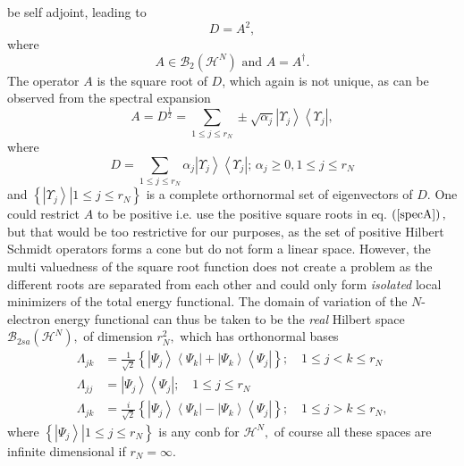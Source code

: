 \documentclass[aps,preprint]{revtex4}%
\begin{document}
be self adjoint, leading to
\begin{equation}
D=A^{2},
\end{equation}
where
\begin{equation}
A\in\mathcal{B}_{2}\left(  \mathcal{H}^{N}\right)  \text{ and }A=A^{\dagger}.
\end{equation}
The operator $A$ is the square root of $D$, which again is not unique, as can
be observed from the spectral expansion
\begin{equation}
A=D^{\frac{1}{2}}=\sum_{1\leq j\leq r_{N}}\pm\sqrt{\alpha_{j}}\left\vert
\Upsilon_{j}\right\rangle \left\langle \Upsilon_{j}\right\vert ,\label{specA}%
\end{equation}
where
\begin{equation}
D=\sum_{1\leq j\leq r_{N}}\alpha_{j}\left\vert \Upsilon_{j}\right\rangle
\left\langle \Upsilon_{j}\right\vert ;\,\alpha_{j}\geq0,1\leq j\leq r_{N}%
\end{equation}
and $\left\{  \left.  \left\vert \Upsilon_{j}\right\rangle \right\vert 1\leq
j\leq r_{N}\right\}  $ is a complete orthornormal set of eigenvectors of $D$.
One could restrict $A$ to be positive i.e. use the positive square roots in
eq. $\left(  \ref{specA}\right)  ,$ but that would be too restrictive for our
purposes, as the set of positive Hilbert Schmidt operators forms a cone
\cite{cone} but do not form a linear space. However, the multi valuedness of
the square root function does not create a problem as the different roots are
separated from each other and could only form \emph{isolated} local minimizers
of the total energy functional. The domain of variation of the $N$-electron
energy functional can thus be taken to be the \emph{real} Hilbert space
$\mathcal{B}_{2sa}\left(  \mathcal{H}^{N}\right)  ,$ of dimension $r_{N}^{2},$
which has orthonormal bases
\begin{align}
\Lambda_{jk} &  =\frac{1}{\sqrt{2}}\left\{  \left\vert \Psi_{j}\right\rangle
\left\langle \Psi_{k}\right\vert +\left\vert \Psi_{k}\right\rangle
\left\langle \Psi_{j}\right\vert \right\}  ;\quad1\leq j<k\leq r_{N}%
\nonumber\\
\Lambda_{jj} &  =\left\vert \Psi_{j}\right\rangle \left\langle \Psi
_{j}\right\vert ;\quad1\leq j\leq r_{N}\nonumber\\
\Lambda_{jk} &  =\frac{i}{\sqrt{2}}\left\{  \left\vert \Psi_{j}\right\rangle
\left\langle \Psi_{k}\right\vert -\left\vert \Psi_{k}\right\rangle
\left\langle \Psi_{j}\right\vert \right\}  ;\quad1\leq j>k\leq r_{N},
\end{align}
where $\left\{  \left.  \left\vert \Psi_{j}\right\rangle \right\vert 1\leq
j\leq r_{N}\right\}  $ is any conb for $\mathcal{H}^{N},$ of course all these
spaces are infinite dimensional if $r_{N}=\infty.$
\end{document}
